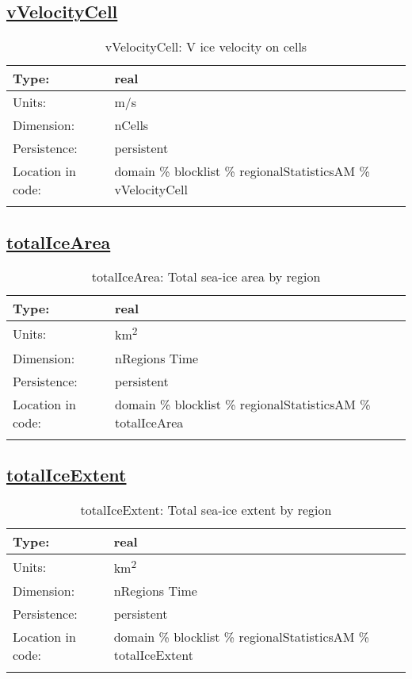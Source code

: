 \subsection[vVelocityCell]{\hyperref[sec:var_tab_regionalStatisticsAM]{vVelocityCell}}
\label{subsec:var_sec_regionalStatisticsAM_vVelocityCell}
\begin{center}
\begin{longtable}{| p{2.0in} | p{4.0in} |}
        \hline 
        Type: & real \\
        \hline 
        Units: & \si{m/s} \\
        \hline 
        Dimension: & nCells \\
        \hline 
        Persistence: & persistent \\
        \hline 
         Location in code: & domain \% blocklist \% regionalStatisticsAM \% vVelocityCell \\
         \hline 
    \caption{vVelocityCell: V ice velocity on cells}
\end{longtable}
\end{center}
\subsection[totalIceArea]{\hyperref[sec:var_tab_regionalStatisticsAM]{totalIceArea}}
\label{subsec:var_sec_regionalStatisticsAM_totalIceArea}
\begin{center}
\begin{longtable}{| p{2.0in} | p{4.0in} |}
        \hline 
        Type: & real \\
        \hline 
        Units: & \si{km^2} \\
        \hline 
        Dimension: & nRegions Time \\
        \hline 
        Persistence: & persistent \\
        \hline 
         Location in code: & domain \% blocklist \% regionalStatisticsAM \% totalIceArea \\
         \hline 
    \caption{totalIceArea: Total sea-ice area by region}
\end{longtable}
\end{center}
\subsection[totalIceExtent]{\hyperref[sec:var_tab_regionalStatisticsAM]{totalIceExtent}}
\label{subsec:var_sec_regionalStatisticsAM_totalIceExtent}
\begin{center}
\begin{longtable}{| p{2.0in} | p{4.0in} |}
        \hline 
        Type: & real \\
        \hline 
        Units: & \si{km^2} \\
        \hline 
        Dimension: & nRegions Time \\
        \hline 
        Persistence: & persistent \\
        \hline 
         Location in code: & domain \% blocklist \% regionalStatisticsAM \% totalIceExtent \\
         \hline 
    \caption{totalIceExtent: Total sea-ice extent by region}
\end{longtable}
\end{center}
